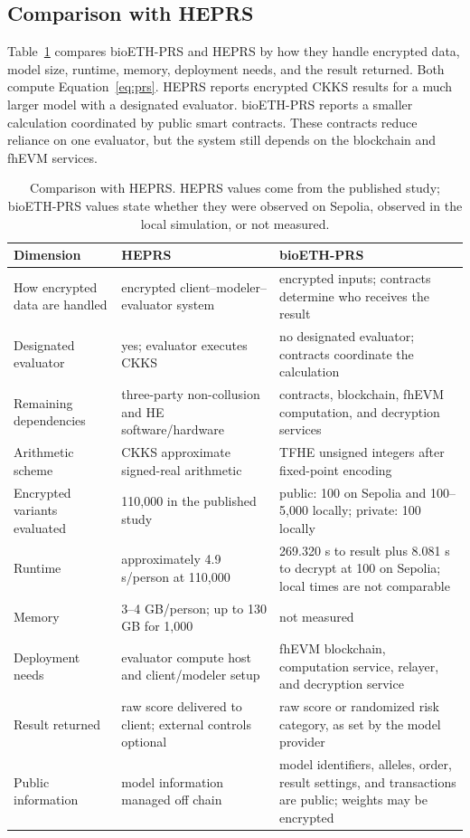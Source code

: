 \documentclass[10pt]{article}
\begin{document}
\subsection{Comparison with HEPRS}

Table~\ref{tab:comparison} compares bioETH-PRS and HEPRS
\citep{knight2026heprs} by how they handle encrypted data, model size, runtime, memory,
deployment needs, and the result returned.  Both compute Equation~\ref{eq:prs}.  HEPRS reports encrypted CKKS
results for a much larger model with a designated evaluator.  bioETH-PRS reports a
smaller calculation coordinated by public smart contracts.  These contracts reduce
reliance on one evaluator, but the system still depends on the blockchain and fhEVM
services.

\begin{table}[t]
\centering
\caption{Comparison with HEPRS. HEPRS values come from the published study;
bioETH-PRS values state whether they were observed on Sepolia, observed in the local
simulation, or not measured.}
\label{tab:comparison}
\footnotesize
\setlength{\tabcolsep}{4pt}
\begin{tabularx}{\textwidth}{@{}p{3.1cm}XX@{}}
\toprule
\textbf{Dimension} & \textbf{HEPRS} \citep{knight2026heprs} & \textbf{bioETH-PRS} \\
\midrule
How encrypted data are handled & encrypted client--modeler--evaluator system & encrypted inputs; contracts determine who receives the result \\
Designated evaluator & yes; evaluator executes CKKS & no designated evaluator; contracts coordinate the calculation \\
Remaining dependencies & three-party non-collusion and HE software/hardware & contracts, blockchain, fhEVM computation, and decryption services \\
Arithmetic scheme & CKKS approximate signed-real arithmetic & TFHE unsigned integers after fixed-point encoding \\
Encrypted variants evaluated & 110,000 in the published study & public: 100 on Sepolia and 100--5,000 locally; private: 100 locally \\
Runtime & approximately 4.9 s/person at 110,000 & 269.320 s to result plus 8.081 s to decrypt at 100 on Sepolia; local times are not comparable \\
Memory & 3--4 GB/person; up to 130 GB for 1,000 & not measured \\
Deployment needs & evaluator compute host and client/modeler setup & fhEVM blockchain, computation service, relayer, and decryption service \\
Result returned & raw score delivered to client; external controls optional & raw score or randomized risk category, as set by the model provider \\
Public information & model information managed off chain & model identifiers, alleles, order, result settings, and transactions are public; weights may be encrypted \\
\bottomrule
\end{tabularx}
\end{table}
\end{document}
